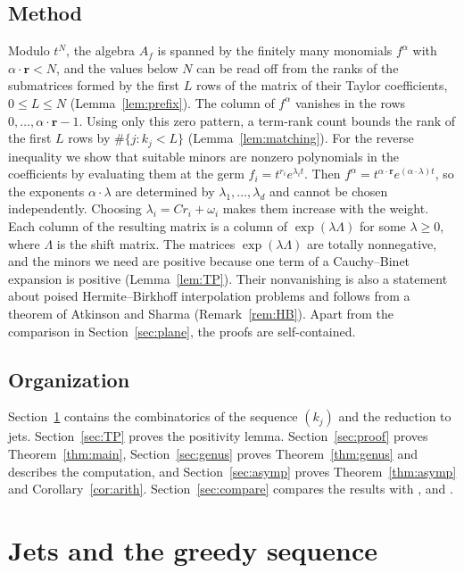 \documentclass{amsart}
\theoremstyle{definition}
\numberwithin{equation}{section}
\newcommand{\bfr}{\mathbf{r}}
\begin{document}
\subsection*{Method}
Modulo $t^N$, the algebra $A_f$ is spanned by the finitely many monomials
$f^\alpha$ with $\alpha\cdot\bfr<N$, and the values below $N$ can be read off
from the ranks of the submatrices formed by the first $L$ rows of the matrix of
their Taylor coefficients, $0\le L\le N$ (Lemma~\ref{lem:prefix}). The column
of $f^\alpha$ vanishes in the rows $0,\dots,\alpha\cdot\bfr-1$. Using only this
zero pattern, a term-rank count bounds the rank of the first $L$ rows by
$\#\{j:k_j<L\}$ (Lemma~\ref{lem:matching}). For the reverse inequality we show
that suitable minors are nonzero polynomials in the coefficients by evaluating
them at the germ $f_i=t^{r_i}e^{\lambda_it}$. Then
$f^\alpha=t^{\alpha\cdot\bfr}e^{(\alpha\cdot\lambda)t}$, so the exponents
$\alpha\cdot\lambda$ are determined by $\lambda_1,\dots,\lambda_d$ and cannot be
chosen independently. Choosing $\lambda_i=Cr_i+\omega_i$ makes them increase
with the weight. Each column of the resulting matrix is a column of
$\exp(\lambda\Lambda)$ for some $\lambda\ge0$, where $\Lambda$ is the shift
matrix. The matrices $\exp(\lambda\Lambda)$ are totally nonnegative, and the
minors we need are positive because one term of a Cauchy--Binet expansion is
positive (Lemma~\ref{lem:TP}). Their nonvanishing is
also a statement about poised Hermite--Birkhoff interpolation problems and
follows from a theorem of Atkinson and Sharma \cite{AS} (Remark~\ref{rem:HB}).
Apart from the comparison in Section~\ref{sec:plane}, the proofs are
self-contained.

\subsection*{Organization}
Section~\ref{sec:prelim} contains the combinatorics of the sequence $(k_j)$ and
the reduction to jets. Section~\ref{sec:TP} proves the positivity lemma.
Section~\ref{sec:proof} proves Theorem~\ref{thm:main}, Section~\ref{sec:genus}
proves Theorem~\ref{thm:genus} and describes the computation, and
Section~\ref{sec:asymp} proves Theorem~\ref{thm:asymp} and
Corollary~\ref{cor:arith}. Section~\ref{sec:compare} compares the results with
\cite{GMO}, \cite{CKV} and \cite{CLM}.

\section{Jets and the greedy sequence}\label{sec:prelim}
\end{document}
